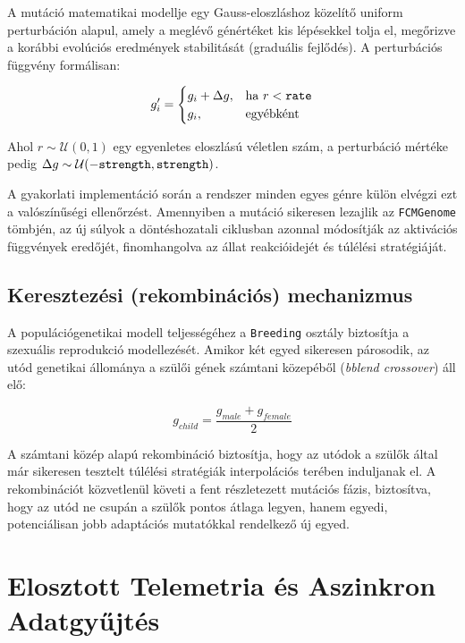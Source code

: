 A mutáció matematikai modellje egy Gauss-eloszláshoz közelítő uniform perturbáción alapul, amely a meglévő génértéket kis lépésekkel tolja el, megőrizve a korábbi evolúciós eredmények stabilitását (graduális fejlődés). A perturbációs függvény formálisan:

\begin{equation}
g'_{i} = 
\begin{cases} 
g_{i} + \Delta g, & \text{ha } r < \text{\texttt{rate}} \\
g_{i}, & \text{egyébként}
\end{cases}
\end{equation}

Ahol $r \sim \mathcal{U}(0, 1)$ egy egyenletes eloszlású véletlen szám, a perturbáció mértéke pedig $\Delta g \sim \mathcal{U}(-\text{\texttt{strength}}, \text{\texttt{strength}})$. 

A gyakorlati implementáció során a rendszer minden egyes génre külön elvégzi ezt a valószínűségi ellenőrzést. Amennyiben a mutáció sikeresen lezajlik az \texttt{FCMGenome} tömbjén, az új súlyok a döntéshozatali ciklusban azonnal módosítják az aktivációs függvények eredőjét, finomhangolva az állat reakcióidejét és túlélési stratégiáját.

\subsection{Keresztezési (rekombinációs) mechanizmus}

A populációgenetikai modell teljességéhez a \texttt{Breeding} osztály biztosítja a szexuális reprodukció modellezését. Amikor két egyed sikeresen párosodik, az utód genetikai állománya a szülői gének számtani közepéből (\textit{bblend crossover}) áll elő:

\begin{equation}
g_{child} = \frac{g_{male} + g_{female}}{2}
\end{equation}

A számtani közép alapú rekombináció biztosítja, hogy az utódok a szülők által már sikeresen tesztelt túlélési stratégiák interpolációs terében induljanak el. A rekombinációt közvetlenül követi a fent részletezett mutációs fázis, biztosítva, hogy az utód ne csupán a szülők pontos átlaga legyen, hanem egyedi, potenciálisan jobb adaptációs mutatókkal rendelkező új egyed.

\section{Elosztott Telemetria és Aszinkron Adatgyűjtés}

